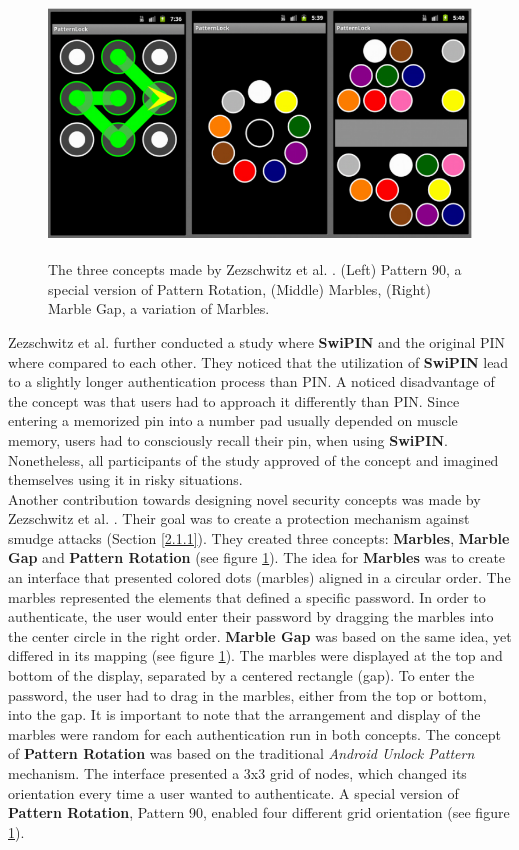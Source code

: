 \begin{figure}[t!]
\centering
\includegraphics[width=13cm, height=7cm]{Chapters/graphics/graphic.PNG}
\caption{The three concepts made by Zezschwitz et al. \cite{Marbles}. (Left) Pattern 90, a special version of Pattern Rotation, (Middle) Marbles, (Right) Marble Gap, a variation of Marbles.}
\label{fig:marbles}
\end{figure}

Zezschwitz et al. \cite{Swipin} further conducted a study where \textbf{SwiPIN} and the original PIN where compared to each other. They noticed that the utilization of \textbf{SwiPIN} lead to a slightly longer authentication process than PIN. A noticed disadvantage of the concept was that users had to approach it differently than PIN. Since entering a memorized pin into a number pad usually depended on muscle memory, users had to consciously recall their pin, when using \textbf{SwiPIN}. Nonetheless, all participants of the study approved of the concept and imagined themselves using it in risky situations. \\

Another contribution towards designing novel security concepts was made by Zezschwitz et al. \cite{Marbles}. Their goal was to create a protection mechanism against smudge attacks (Section \ref{2.1.1}). They created three concepts: \textbf{Marbles}, \textbf{Marble Gap} and \textbf{Pattern Rotation} (see figure \ref{fig:marbles}). The idea for \textbf{Marbles} was to create an interface that presented colored dots (marbles) aligned in a circular order. The marbles represented the elements that defined a specific password. In order to authenticate, the user would enter their password by dragging the marbles into the center circle in the right order. \textbf{Marble Gap} was based on the same idea, yet differed in its mapping (see figure \ref{fig:marbles}). The marbles were displayed at the top and bottom of the display, separated by a centered rectangle (gap). To enter the password, the user had to drag in the marbles, either from the top or bottom, into the gap. It is important to note that the arrangement and display of the marbles were random for each authentication run in both concepts. The concept of \textbf{Pattern Rotation} was based on the traditional \textit{Android Unlock Pattern} mechanism. The interface presented a 3x3 grid of nodes, which changed its orientation every time a user wanted to authenticate. A special version of \textbf{Pattern Rotation}, Pattern 90, enabled four different grid orientation (see figure \ref{fig:marbles}). \\

